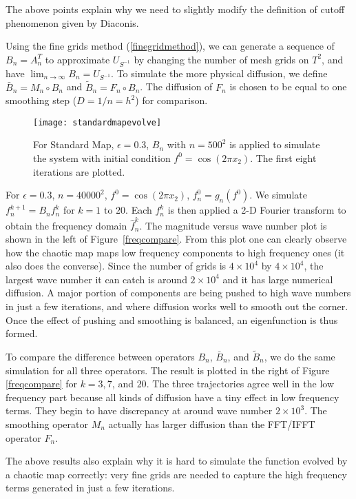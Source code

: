 The above points explain why we need to slightly modify the definition of cutoff phenomenon given by Diaconis. 

Using the fine grids method (\ref{finegridmethod}), we can generate a sequence of $B_n = A_n^T$ to
approximate $U_{S^{-1}}$ by changing the number of mesh grids on $T^2$, and have $\lim_{n \rightarrow
\infty} B_n= U_{S^{-1}}$. To simulate the more physical diffusion, we define $\bar{B}_n = M_n \circ B_n$ and
$\tilde{B}_n = F_n \circ B_n$. The diffusion of $F_n$ is chosen to be equal to one smoothing step ($D= 1/n= h^2$) for comparison.

\begin{figure}
    \centerline{
      \texttt{[image: standardmapevolve]}
    }
    \caption{\label{standardmapevolve}For Standard Map, $\epsilon = 0.3$, $B_n$ with $n=500^2$ is applied to simulate the system with initial condition $f^0=\cos(2\pi x_2)$. The first eight iterations are plotted.}
\end{figure}




For $\epsilon = 0.3$, $n=40000^2$, $f^0=\cos(2\pi x_2)$, $f_n^0 = g_n(f^0)$. We simulate
$f_n^{k+1} =B_n f_n^k$ for $k=1$ to $20$. Each $f_n^k$ is then applied a 2-D Fourier transform to
obtain the frequency domain $\hat{f}^k_n$. The magnitude versus wave number plot is shown in the left
of Figure~\ref{freqcompare}. From this plot one can clearly observe how the chaotic map maps low
frequency components to high frequency ones (it also does the converse). Since the number of grids
is $4 \times 10^4$ by $4 \times 10^4$, the largest wave number it can catch is around $2 \times
10^4$ and it has large numerical diffusion. A major portion of components are being pushed
to high wave numbers in just a few iterations, and where diffusion works well to smooth out the corner. Once the effect of pushing and smoothing is balanced, an eigenfunction is thus formed.

To compare the difference between operators $B_n$, $\bar{B}_n$, and $\tilde{B}_n$, we do the same
simulation for all three operators. The result is plotted in the right of Figure~
\ref{freqcompare} for $k = 3,7$, and $20$. The three trajectories agree well in the low frequency part
because all kinds of diffusion have a tiny effect in low frequency terms. They begin to have
discrepancy at around wave number $2 \times 10^3$. The smoothing operator $M_n$ actually has larger
diffusion than the FFT/IFFT operator $F_n$.

The above results also explain why it is hard to simulate the function evolved by a chaotic map
correctly: very fine grids are needed to capture the high frequency terms generated in just a
few iterations.

